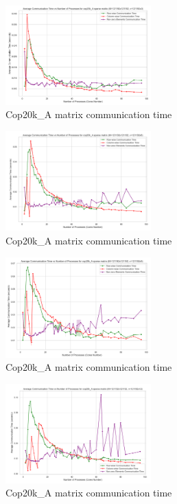 \documentclass[12pt,oneside]{book} %
\begin{document}
\begin{figure}[H]
    \centering
    \includegraphics[width=0.5\textwidth]{../results/fat_vector_dim/cop20k_A_k3_communication_time.png}
    \caption{Cop20k\_A matrix communication time}\label{fig:cop20k-a-k3-communication-time}
\end{figure}

\begin{figure}[H]
    \centering
    \includegraphics[width=0.5\textwidth]{../results/fat_vector_dim/cop20k_A_k6_communication_time.png}
    \caption{Cop20k\_A matrix communication time}\label{fig:cop20k-a-k6-communication-time}
\end{figure}

\begin{figure}[H]
    \centering
    \includegraphics[width=0.5\textwidth]{../results/fat_vector_dim/cop20k_A_k9_communication_time.png}
    \caption{Cop20k\_A matrix communication time}\label{fig:cop20k-a-k9-communication-time}
\end{figure}

\begin{figure}[H]
    \centering
    \includegraphics[width=0.5\textwidth]{../results/fat_vector_dim/cop20k_A_k12_communication_time.png}
    \caption{Cop20k\_A matrix communication time}\label{fig:cop20k-a-k12-communication-time}
\end{figure}
\end{document}
